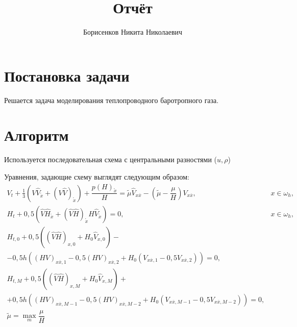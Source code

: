 \documentclass[12pt,a4paper]{article}
\author{Борисенков Никита Николаевич}
\title{Отчёт}
\newcommand{\xo}{\mathring{x}}
\newcommand{\xx}{x\overline{x}}
\DeclareMathOperator*{\mmax}{max}
\begin{document}
\maketitle
\section{Постановка задачи}

Решается задача моделирования теплопроводного баротропного газа.

\section{Алгоритм}

Используется последовательная схема с центральными разностями ($u, \rho$)

Уравнения, задающие схему выглядят следующим образом:
$$
\begin{array}{lc}
    V_t + \frac13 \left( V\hat{V}_{\xo} + \left( V\hat{V} \right)_{\xo} \right) + \dfrac{p\left(H\right)_{\xo}}{H} = \tilde{\mu}\hat{V}_{\xx} - \left( \tilde{\mu} - \dfrac{\mu}{H} \right)V_{\xx}, & x \in \omega_h, \\

    H_t + 0,\!5 \left(  \hat{V}\hat{H}_{\xo} + \left(\hat{V}\hat{H}\right)_{\xo} H\hat{V}_{\xo}\right) = 0, & x \in \omega_h, \\

    H_{t,0} + 0,\!5\left(\left(\hat{V}\hat{H}\right)_{x,0} + H_0\hat{V}_{x,0}\right) - & \\
    - 0,\!5h\left(\left(HV\right)_{\xx,1} - 0,\!5\left(HV\right)_{\xx,2} + H_0\left(V_{\xx,1} - 0,\!5V_{\xx,2}\right)\right) = 0, & \\

    H_{t,M} + 0,\!5\left(\left(\hat{V}\hat{H}\right)_{x,M} + H_0\hat{V}_{x,M}\right) + & \\
    + 0,\!5h\left(\left(HV\right)_{\xx,M-1} - 0,\!5\left(HV\right)_{\xx,M-2} + H_0\left(V_{\xx,M-1} - 0,\!5V_{\xx,M-2}\right)\right) = 0, & \\

    \tilde{\mu} = \mmax_{m} \dfrac{\mu}{H} & \\
\end{array}
$$
\end{document}
